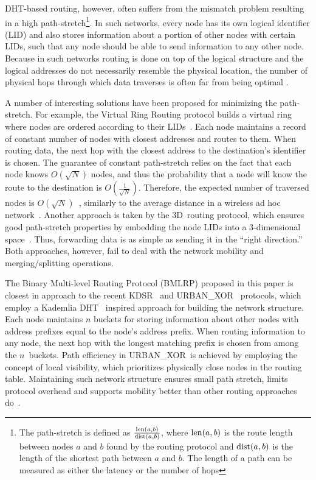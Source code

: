 \documentclass[conference]{IEEEtran}
\theoremstyle{definition}
\newcommand{\urbanxor}{URBAN\_XOR}
\begin{document}
DHT-based routing, however, often suffers from the mismatch problem resulting in a high path-stretch\footnote{The path-stretch is defined as $ \frac{{\rm len}(a,b)}{{\rm dist}(a,b)} $, where ${\rm len}(a,b)$ is the route length between nodes $a$ and $b$ found by the routing protocol and ${\rm dist}(a,b)$ is the length of the shortest path between $a$ and $b$. The length of a path can be measured as either the latency or the number of hops}. In such networks, every node has its own logical identifier (LID) and also stores information about a portion of other nodes with certain LIDs, such that any node should be able to send information to any other node. Because in such networks routing is done on top of the logical structure and the logical addresses do not necessarily resemble the physical location, the number of physical hops through which data traverses is often far from being optimal \cite{Abid}.

A number of interesting solutions have been proposed for minimizing the path-stretch. For example, the Virtual Ring Routing protocol builds a virtual ring where nodes are ordered according to their LIDs~\cite{VRR}. Each node maintains a record of constant number of nodes with closest addresses and routes to them. When routing data, the next hop with the closest address to the destination's identifier is chosen. The guarantee of constant path-stretch relies on the fact that each node knows $O(\sqrt{N})$ nodes, and thus the probability that a node will know the route to the destination is $O(\frac{1}{\sqrt{N}})$. Therefore, the expected number of traversed nodes is $O(\sqrt{N})$~\cite{VRR}, similarly to the average distance in a wireless ad hoc network~\cite{Kleinrock}. Another approach is taken by the 3D~routing protocol, which ensures good path-stretch properties by embedding the node LIDs into a 3-dimensional space~\cite{3drp}. Thus, forwarding data is as simple as sending it in the ``right direction.'' Both approaches, however, fail to deal with the network mobility and merging/splitting operations. 

The Binary Multi-level Routing Protocol (BMLRP) proposed in this paper is closest in approach to the recent KDSR~\cite{kdsr} and \urbanxor~\cite{Pasquini} protocols, which employ a Kademlia DHT~\cite{kademlia} inspired approach for building the network structure. Each node maintains $n$ buckets for storing information about other nodes with address prefixes equal to the node's address prefix. When routing information to any node, the next hop with the longest matching prefix is chosen from among the $n$~buckets. Path efficiency in \urbanxor~is achieved by employing the concept of local visibility, which prioritizes physically close nodes in the routing table. Maintaining such network structure ensures small path stretch, limits protocol overhead and supports mobility better than other routing approaches do~\cite{urbanxor}.
\end{document}
